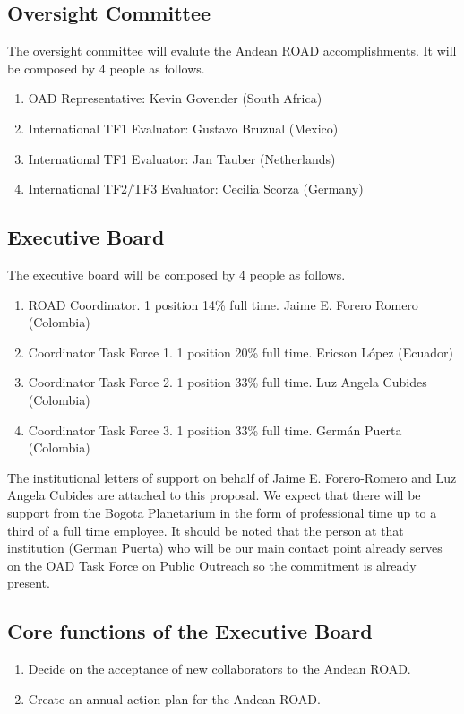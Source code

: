 \documentclass[12pt]{article}
\begin{document}
\subsection*{Oversight Committee}

The oversight committee will evalute the Andean ROAD
accomplishments. It will be composed by 4 people as follows.
\begin{enumerate}
\item OAD Representative: Kevin Govender (South Africa)
\item International TF1 Evaluator: Gustavo Bruzual (Mexico)
\item International TF1 Evaluator: Jan Tauber (Netherlands)
\item International TF2/TF3 Evaluator: Cecilia Scorza (Germany)
\end{enumerate}
\subsection*{Executive Board}
\noindent
The executive board will be composed by 4 people as follows.
\begin{enumerate}
\item ROAD Coordinator. 1 position 14\% full time. Jaime E. Forero
  Romero (Colombia) 
\item Coordinator Task Force 1. 1 position 20\% full time. Ericson
  L\'opez (Ecuador) 
\item Coordinator Task Force 2. 1 position 33\% full time. Luz Angela
  Cubides (Colombia) 
\item Coordinator Task Force 3. 1 position 33\% full time. Germán
  Puerta (Colombia) 
\end{enumerate}

\noindent
The institutional letters of support on behalf of Jaime
E. Forero-Romero and Luz Angela Cubides are attached to this
proposal. We expect that there will be support from the Bogota
Planetarium in the form of professional time up to a third of a full
time employee. It should be noted that the person at that institution
(German Puerta) who will be our main contact point already serves on
the OAD Task Force on Public Outreach so the commitment is already
present. 

\subsection*{Core functions of the Executive Board}

\begin{enumerate}
\item Decide on the acceptance of new collaborators to the Andean ROAD.
\item Create an annual action plan for the Andean ROAD.
\end{enumerate}
\end{document}
